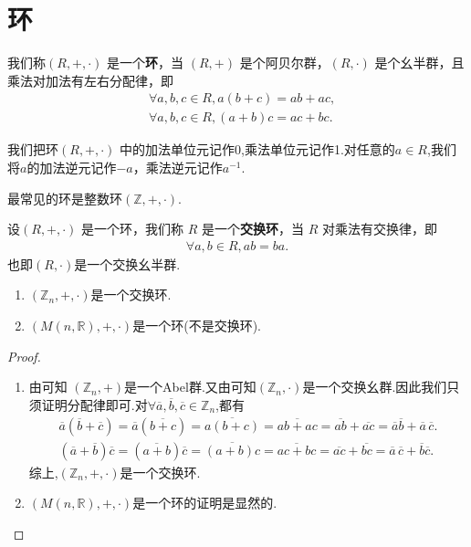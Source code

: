 \documentclass[../../main.tex]{subfiles}
\begin{document}
\section{环}

\begin{definition}[环]
我们称$(R, +, \cdot)$ 是一个\textbf{环}，当 $(R, +)$ 是个阿贝尔群，$(R, \cdot)$ 是个幺半群，且乘法对加法有左右分配律，即
\begin{align*}
&\forall a,b,c\in R, a(b + c)=ab + ac ,\\
&\forall a,b,c\in R, (a + b)c=ac + bc .
\end{align*} 
\end{definition}
\begin{remark}
我们把环$(R, +, \cdot)$ 中的加法单位元记作0,乘法单位元记作1.对任意的$a\in R$,我们将$a$的加法逆元记作$-a$，乘法逆元记作$a^{-1}$.
\end{remark}
\begin{note}
最常见的环是整数环$(\mathbb{Z},+,\cdot)$.
\end{note}

\begin{definition}[交换环]
设$(R, +, \cdot)$ 是一个环，我们称 $R$ 是一个\textbf{交换环}，当 $R$ 对乘法有交换律，即
\begin{align*}
\forall a,b\in R, ab = ba.
\end{align*}
也即$(R,\cdot)$是一个交换幺半群.
\end{definition}

\begin{example}
\begin{enumerate}
\item $(\mathbb{Z}_n,+,\cdot)$是一个交换环.

\item $(M(n,\mathbb{R}),+,\cdot)$是一个环(不是交换环).
\end{enumerate}
\end{example}
\begin{proof}
\begin{enumerate}
\item 由可知 $(\mathbb{Z}_n,+)$是一个Abel群.又由可知$(\mathbb{Z}_n,\cdot)$是一个交换幺群.因此我们只须证明分配律即可.对$\forall \overline{a},\overline{b},\overline{c}\in \mathbb{Z} _n$,都有
\begin{gather*}
\overline{a}\left( \overline{b}+\overline{c} \right) =\overline{a}\left( \overline{b+c} \right) =\overline{a\left( b+c \right) }=\overline{ab+ac}=\overline{ab}+\overline{ac}=\overline{a}\overline{b}+\overline{a}\,\overline{c}.
\\
\left( \overline{a}+\overline{b} \right) \overline{c}=\left( \overline{a+b} \right) \overline{c}=\overline{\left( a+b \right) c}=\overline{ac+bc}=\overline{ac}+\overline{bc}=\overline{a}\,\overline{c}+\overline{b}\overline{c}.
\end{gather*}
综上,$(\mathbb{Z}_n,+,\cdot)$是一个交换环.

\item $(M(n,\mathbb{R}),+,\cdot)$是一个环的证明是显然的.
\end{enumerate}
\end{proof}
\end{document}
